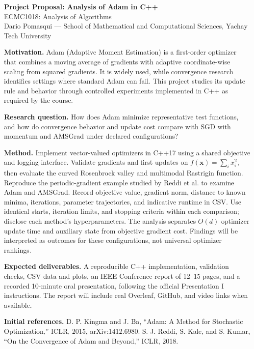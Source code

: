\documentclass[10pt]{article}
\begin{document}
\begin{center}
{\Large\bfseries Project Proposal: Analysis of Adam in C++}\\
ECMC1018: Analysis of Algorithms\\
Dario Pomasqui — School of Mathematical and Computational Sciences, Yachay Tech University
\end{center}
\textbf{Motivation.} Adam (Adaptive Moment Estimation) is a first-order optimizer that combines a moving average of gradients with adaptive coordinate-wise scaling from squared gradients. It is widely used, while convergence research identifies settings where standard Adam can fail. This project studies its update rule and behavior through controlled experiments implemented in C++ as required by the course.

\textbf{Research question.} How does Adam minimize representative test functions, and how do convergence behavior and update cost compare with SGD with momentum and AMSGrad under declared configurations?

\textbf{Method.} Implement vector-valued optimizers in C++17 using a shared objective and logging interface. Validate gradients and first updates on $f(\mathbf{x})=\sum_i x_i^2$, then evaluate the curved Rosenbrock valley and multimodal Rastrigin function. Reproduce the periodic-gradient example studied by Reddi et al. to examine Adam and AMSGrad. Record objective value, gradient norm, distance to known minima, iterations, parameter trajectories, and indicative runtime in CSV. Use identical starts, iteration limits, and stopping criteria within each comparison; disclose each method's hyperparameters. The analysis separates $O(d)$ optimizer update time and auxiliary state from objective gradient cost. Findings will be interpreted as outcomes for these configurations, not universal optimizer rankings.

\textbf{Expected deliverables.} A reproducible C++ implementation, validation checks, CSV data and plots, an IEEE Conference report of 12–15 pages, and a recorded 10-minute oral presentation, following the official Presentation I instructions. The report will include real Overleaf, GitHub, and video links when available.

\textbf{Initial references.} D. P. Kingma and J. Ba, “Adam: A Method for Stochastic Optimization,” ICLR, 2015, arXiv:1412.6980. S. J. Reddi, S. Kale, and S. Kumar, “On the Convergence of Adam and Beyond,” ICLR, 2018.
\end{document}
